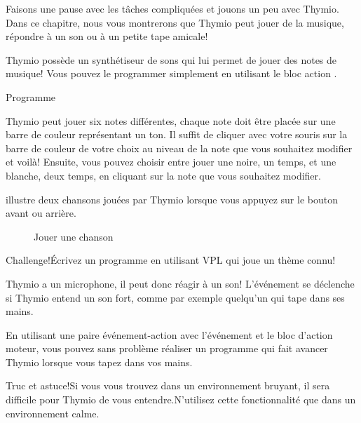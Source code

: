 \label{ch.bells}

Faisons une pause avec les tâches compliquées et jouons un peu avec Thymio. Dans ce chapitre, nous vous montrerons que Thymio peut jouer de la musique, répondre à un son ou à un petite tape amicale!


Thymio possède un synthétiseur de sons qui lui permet de jouer des notes de musique! Vous pouvez le programmer simplement en utilisant le bloc action .

{\raggedleft \hfill Programme }

Thymio peut jouer six notes différentes, chaque note doit être placée sur une barre de couleur représentant un ton. Il suffit de cliquer avec votre souris sur la barre de couleur de votre choix au niveau de la note que vous souhaitez modifier et voilà! Ensuite, vous pouvez choisir entre jouer une noire, un temps, et une blanche, deux temps, en cliquant sur la note que vous souhaitez modifier.

 illustre deux chansons jouées par Thymio lorsque vous appuyez sur le bouton avant ou arrière.

\begin{figure}
\begin{center}
\caption{Jouer une chanson}\label{fig.music}
\end{center}
\end{figure}

\begin{bclogo}[couleur = pink!30, arrondi = 0.1, logo = \bccrayon, ombre = true]{Challenge!}Écrivez un programme en utilisant VPL qui joue un thème connu!
\end{bclogo}


Thymio a un microphone, il peut donc réagir à un son! L'événement  se déclenche si Thymio entend un son fort, comme par exemple quelqu'un qui tape dans ses mains. 

En utilisant une paire événement-action avec l'événement  et le bloc d'action moteur, vous pouvez sans problème réaliser un programme qui fait avancer Thymio lorsque vous tapez dans vos mains.

\begin{bclogo}[couleur = blue!30, arrondi = 0.1, logo = \bcinfo, ombre = true]{Truc et astuce!}Si vous vous trouvez dans un environnement bruyant, il sera difficile pour Thymio de vous entendre.N'utilisez cette fonctionnalité que dans un environnement calme.
\end{bclogo}

